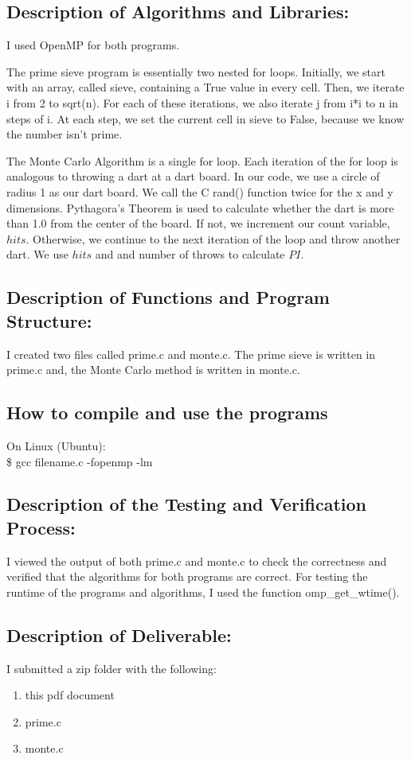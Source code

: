 \documentclass[12pt]{article}
\begin{document}
\subsection*{Description of Algorithms and Libraries: } 
I used OpenMP for both programs.  

The prime sieve program is essentially two nested for loops. Initially, we start with an 
array, called sieve, containing a True value in every cell. Then, we iterate i from 2 to
sqrt(n). For each of these iterations, we also iterate j from i*i to n in steps of i. At
each step, we set the current cell in sieve to False, because we know the number isn't prime.

The Monte Carlo Algorithm is a single for loop. Each iteration of the for loop is analogous 
to throwing a dart at a dart board. In our code, we use a circle of radius 1 as our dart board.
We call the C rand() function twice for the x and y dimensions. Pythagora's Theorem is used
to calculate whether the dart is more than 1.0 from the center of the board. If not, we
increment our count variable, $hits$. Otherwise, we continue to the next iteration of the loop
and throw another dart. We use $hits$ and and number of throws to calculate $PI$.

\subsection*{Description of Functions and Program Structure: } 
I created two files called prime.c and monte.c. 
The prime sieve is written in prime.c and, the Monte Carlo method is written in monte.c.  

\subsection*{How to compile and use the programs}
On Linux (Ubuntu): \\
 \$ gcc filename.c -fopenmp -lm 

\subsection*{Description of the Testing and Verification Process: }
I viewed the output of both prime.c and monte.c to check the 
correctness and verified that the algorithms for both programs are correct.  
For testing the runtime of the programs and algorithms, I used the function omp\_get\_wtime().

\subsection*{Description of Deliverable: }
I submitted a zip folder with the following: 
\begin{enumerate}
  \item this pdf document
  \item prime.c
  \item monte.c
\end{enumerate}
\end{document}
